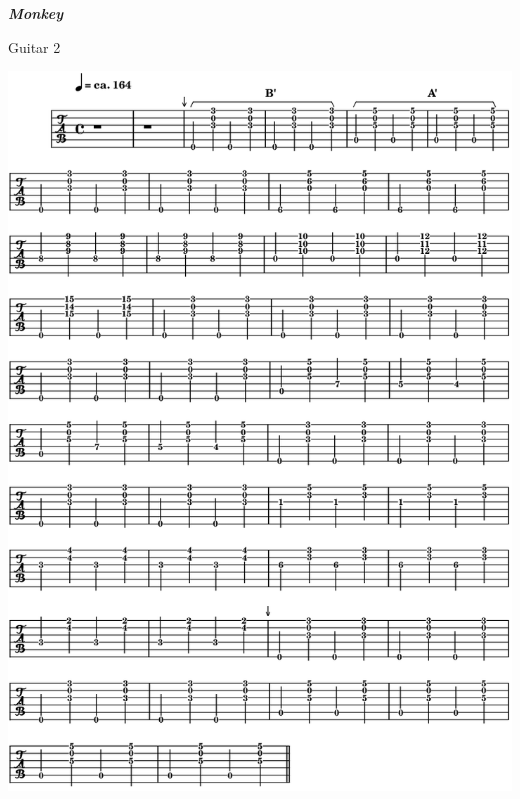\newpage
\textbf{\textsl{Monkey}}  

\smallskip

 \quad Guitar 2
 
\begin{center}
\includegraphics[width=\textwidth]{img/neD2}
\end{center}

